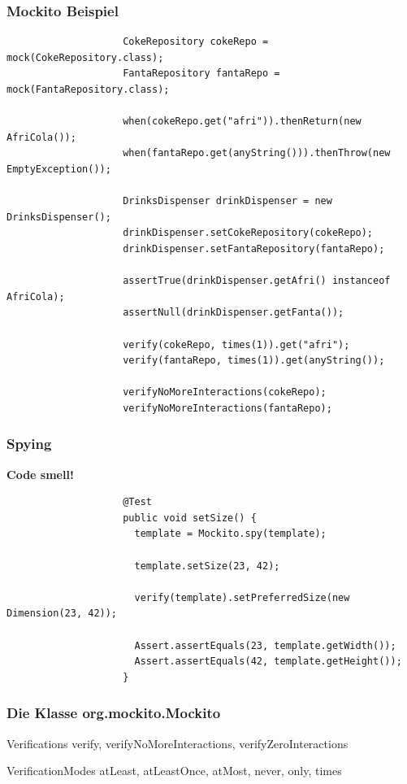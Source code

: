 \documentclass{beamer}
\begin{document}
			\begin{frame}[fragile]
				\frametitle{Mockito Beispiel}

				\begin{lstlisting}
					CokeRepository cokeRepo = mock(CokeRepository.class);
					FantaRepository fantaRepo = mock(FantaRepository.class);

					when(cokeRepo.get("afri")).thenReturn(new AfriCola());
					when(fantaRepo.get(anyString())).thenThrow(new EmptyException());

					DrinksDispenser drinkDispenser = new DrinksDispenser();
					drinkDispenser.setCokeRepository(cokeRepo);
					drinkDispenser.setFantaRepository(fantaRepo);

					assertTrue(drinkDispenser.getAfri() instanceof AfriCola);
					assertNull(drinkDispenser.getFanta());

					verify(cokeRepo, times(1)).get("afri");
					verify(fantaRepo, times(1)).get(anyString());

					verifyNoMoreInteractions(cokeRepo);
					verifyNoMoreInteractions(fantaRepo);
				\end{lstlisting}
			\end{frame}

			\begin{frame}[fragile]
				\frametitle{Spying}

				\color{red}\textbf{Code smell!}
				\color{black}
				\begin{lstlisting}
					@Test
					public void setSize() {
					  template = Mockito.spy(template);

					  template.setSize(23, 42);

					  verify(template).setPreferredSize(new Dimension(23, 42));

					  Assert.assertEquals(23, template.getWidth());
					  Assert.assertEquals(42, template.getHeight());
					}
				\end{lstlisting}
			\end{frame}

			\begin{frame}
				\frametitle{Die Klasse org.mockito.Mockito}

				\begin{block}{Verifications}
				verify, verifyNoMoreInteractions, verifyZeroInteractions
				\end{block}

				\begin{block}{VerificationModes}
				atLeast, atLeastOnce, atMost, never, only, times
				\end{block}
			\end{frame}
\end{document}
